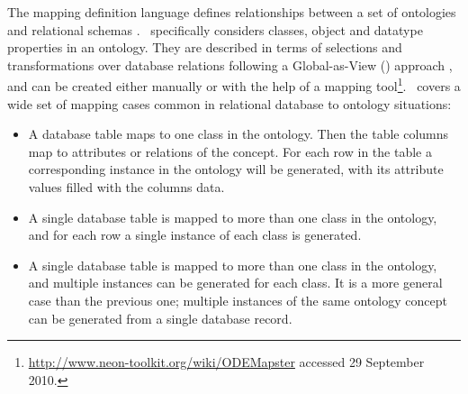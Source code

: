 The mapping definition language \rtwoo defines relationships between a set of ontologies and relational schemas \cite{Barrasa_04}.
\rtwoo\ specifically considers classes, object and datatype properties in an ontology. They are described in terms of selections and transformations over database relations following a Global-as-View (\gav) approach \cite{Lenzerini_02}, and can be created either manually or with the help of a mapping tool\footnote{\url{http://www.neon-toolkit.org/wiki/ODEMapster} accessed 29 September 2010.}.
\rtwoo\ covers a wide set of mapping cases common in relational database to ontology situations: %
\begin{itemize}
\item A database table maps to one class in the ontology. Then the table columns map to attributes or relations of the concept. For each row in the table a corresponding instance in the ontology will be generated, with its attribute values filled with the columns data.
\item A single database table is mapped to more than one class in the ontology, and for each row a single instance of each class is generated. %
\item A single database table is mapped to more than one class in the ontology, and multiple instances can be generated for each class. It is a more general case than the previous one; multiple instances of the same ontology concept can be generated from a single database record.
\end{itemize}

